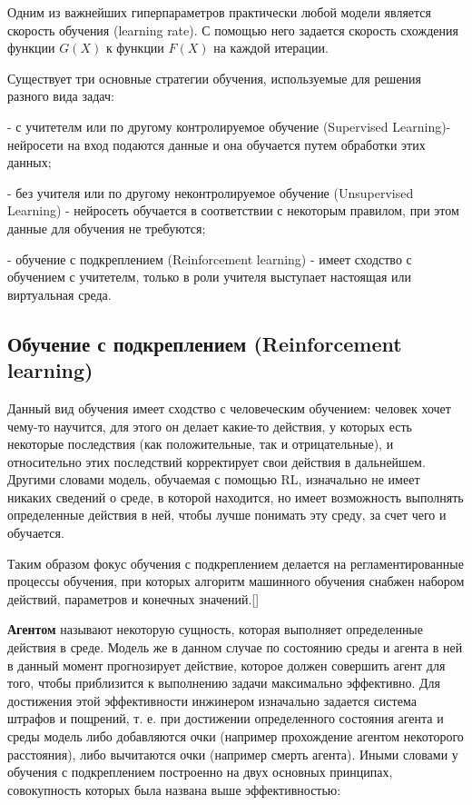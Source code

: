 \documentclass[bachelor, och, coursework]{shiza}
\begin{document}
Одним из важнейших гиперпараметров практически любой модели является скорость обучения (learning rate). С помощью него задается скорость схождения функции
$G(X)$ к функции $F(X)$ на каждой итерации.

Существует три основные стратегии обучения, используемые для решения разного вида задач:

- с учитетелм или по другому контролируемое обучение (Supervised Learning)- нейросети на вход подаются данные и она обучается путем обработки этих данных;

- без учителя или по другому неконтролируемое обучение (Unsupervised Learning) - нейросеть обучается в соответствии с некоторым правилом, при этом данные для обучения не требуются;

- обучение с подкреплением (Reinforcement learning) - имеет сходство с обучением с учитетелм, только в роли учителя выступает настоящая или виртуальная среда.

\subsection{Обучение с подкреплением (Reinforcement learning)}

Данный вид обучения имеет сходство с человеческим обучением: человек хочет чему-то научится, для этого он делает какие-то действия, у которых есть некоторые
последствия (как положительные, так и отрицательные), и относительно этих последствий корректирует свои действия в дальнейшем. Другими словами модель, обучаемая
с помощью RL, изначально не имеет никаких сведений о среде, в которой находится, но имеет возможность выполнять определенные действия в ней, чтобы лучше
понимать эту среду, за счет чего и обучается.

Таким образом фокус обучения с подкреплением делается на регламентированные процессы обучения, при которых алгоритм машинного обучения снабжен набором действий, параметров и конечных значений.[]

\textbf{Агентом} называют некоторую сущность, которая выполняет определенные действия в среде. Модель же в данном случае по состоянию среды и агента в ней
в данный момент прогнозирует действие, которое должен совершить агент для того, чтобы приблизится к выполнению задачи максимально эффективно. Для достижения
этой эффективности инжинером изначально задается система штрафов и пощрений, т. е. при достижении определенного состояния агента и среды модель либо добавляются очки
(например прохождение агентом некоторого расстояния), либо вычитаются очки (например смерть агента). Иными словами у обучения с подкреплением построенно на двух
основных принципах, совокупность которых была названа выше эффективностью:
\end{document}

